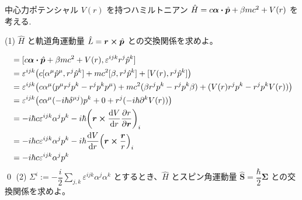 \documentclass[uplatex,dvipdfmx,a4paper,11pt]{jlreq}
\makeatletter
\newcommand{\rr}{\bm{r}}
\newcommand{\pp}{\bm{p}}
\theoremstyle{definition}
\renewenvironment{proof}[1][\proofname]{\par
  \normalfont
  \topsep6\p@\@plus6\p@ \trivlist
  \item[\hskip\labelsep{\bfseries #1}\@addpunct{\bfseries}]\ignorespaces\quad\par
}{%
  \qed\endtrivlist\@endpefalse
}
\renewcommand\proofname{証明}
\makeatother
\begin{document}
\begin{problem}
中心力ポテンシャル $V(r)$ を持つハミルトニアン $\hat{H} = c\bm{\alpha}\vdot\hat{\pp} + \beta mc^2 + V(r)$ を考える.
\end{problem}
(1) $\hat{H}$ と軌道角運動量 $\hat{L} = \rr\cross\hat{\pp}$ との交換関係を求めよ。
\begin{proof}
  \begin{align}
    [\hat{H}, \hat{L}^i] & = [c\bm{\alpha}\vdot\hat{\pp} + \beta mc^2 + V(r), \varepsilon^{ijk}r^j\hat{p}^k]                                               \\
                         & = \varepsilon^{ijk}\qty(c[\alpha^\mu\hat{p}^\mu, r^j\hat{p}^k] + mc^2[\beta, r^j\hat{p}^k] + [V(r), r^j\hat{p}^k])              \\
                         & = \varepsilon^{ijk}\qty(c\alpha^\mu(p^\mu r^jp^k - r^jp^kp^\mu) + mc^2(\beta r^jp^k - r^jp^k\beta) + (V(r)r^jp^k - r^jp^kV(r))) \\
                         & = \varepsilon^{ijk}\qty(c\alpha^\mu (-i\hbar\delta^{\mu j})p^k + 0 + r^j(-i\hbar\partial^kV(r)))                                \\
                         & = -i\hbar c\varepsilon^{ijk}\alpha^jp^k - i\hbar\qty(\rr\cross\dv{V}{r}\pdv{r}{\rr})_i                                          \\
                         & = -i\hbar c\varepsilon^{ijk}\alpha^jp^k - i\hbar\dv{V}{r}\qty(\rr\cross\frac{\rr}{r})_i                                         \\
                         & = -i\hbar c\varepsilon^{ijk}\alpha^jp^k
  \end{align}
\end{proof}
(2) $\Sigma^i := -\dfrac{i}{2}\sum_{j,k}\varepsilon^{ijk}\alpha^j\alpha^k$ とするとき、$\hat{H}$ とスピン角運動量 $\hat{\bm{S}} = \dfrac{\hbar}{2}\bm{\Sigma}$ との交換関係を求めよ。
\end{document}
